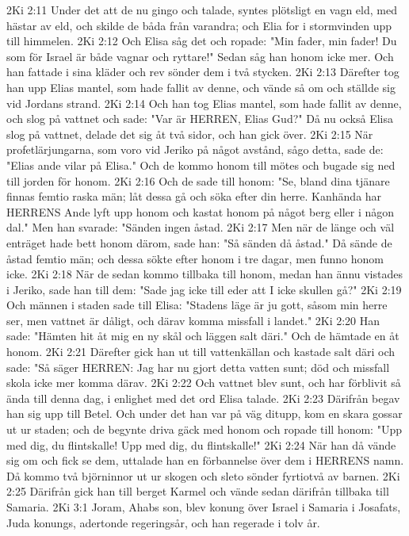 2Ki 2:11  Under det att de nu gingo och talade, syntes plötsligt en vagn eld, med hästar av eld, och skilde de båda från varandra; och Elia for i stormvinden upp till himmelen.
2Ki 2:12  Och Elisa såg det och ropade: "Min fader, min fader! Du som för Israel är både vagnar och ryttare!" Sedan såg han honom icke mer. Och han fattade i sina kläder och rev sönder dem i två stycken.
2Ki 2:13  Därefter tog han upp Elias mantel, som hade fallit av denne, och vände så om och ställde sig vid Jordans strand.
2Ki 2:14  Och han tog Elias mantel, som hade fallit av denne, och slog på vattnet och sade: "Var är HERREN, Elias Gud?" Då nu också Elisa slog på vattnet, delade det sig åt två sidor, och han gick över.
2Ki 2:15  När profetlärjungarna, som voro vid Jeriko på något avstånd, sågo detta, sade de: "Elias ande vilar på Elisa." Och de kommo honom till mötes och bugade sig ned till jorden för honom.
2Ki 2:16  Och de sade till honom: "Se, bland dina tjänare finnas femtio raska män; låt dessa gå och söka efter din herre. Kanhända har HERRENS Ande lyft upp honom och kastat honom på något berg eller i någon dal." Men han svarade: "Sänden ingen åstad.
2Ki 2:17  Men när de länge och väl enträget hade bett honom därom, sade han: "Så sänden då åstad." Då sände de åstad femtio män; och dessa sökte efter honom i tre dagar, men funno honom icke.
2Ki 2:18  När de sedan kommo tillbaka till honom, medan han ännu vistades i Jeriko, sade han till dem: "Sade jag icke till eder att I icke skullen gå?"
2Ki 2:19  Och männen i staden sade till Elisa: "Stadens läge är ju gott, såsom min herre ser, men vattnet är dåligt, och därav komma missfall i landet."
2Ki 2:20  Han sade: "Hämten hit åt mig en ny skål och läggen salt däri." Och de hämtade en åt honom.
2Ki 2:21  Därefter gick han ut till vattenkällan och kastade salt däri och sade: "Så säger HERREN: Jag har nu gjort detta vatten sunt; död och missfall skola icke mer komma därav.
2Ki 2:22  Och vattnet blev sunt, och har förblivit så ända till denna dag, i enlighet med det ord Elisa talade.
2Ki 2:23  Därifrån begav han sig upp till Betel. Och under det han var på väg ditupp, kom en skara gossar ut ur staden; och de begynte driva gäck med honom och ropade till honom: "Upp med dig, du flintskalle! Upp med dig, du flintskalle!"
2Ki 2:24  När han då vände sig om och fick se dem, uttalade han en förbannelse över dem i HERRENS namn. Då kommo två björninnor ut ur skogen och sleto sönder fyrtiotvå av barnen.
2Ki 2:25  Därifrån gick han till berget Karmel och vände sedan därifrån tillbaka till Samaria.
2Ki 3:1  Joram, Ahabs son, blev konung över Israel i Samaria i Josafats, Juda konungs, adertonde regeringsår, och han regerade i tolv år.
